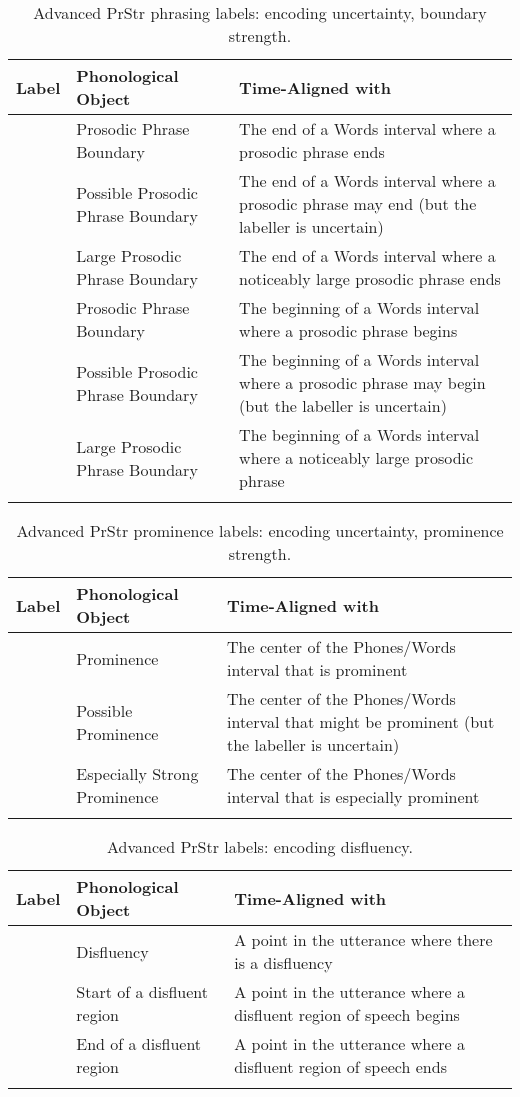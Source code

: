 \documentclass[11pt, twoside]{memoir}
\def\textlabel#1{{\relsize{-.5}\fontspec[Mapping=tex-text]{Roboto Mono}{#1}}}
\begin{document}
\begin{longtable}{cp{.3\linewidth}p{.45\linewidth}}
	\toprule
	\textbf{Label} & \textbf{Phonological Object} & \textbf{Time-Aligned with} \tabularnewline
	\midrule
	\endhead
	\rowcolor{green}
	\textlabel{]} & Prosodic Phrase Boundary & The end of a Words interval where a prosodic phrase ends \tabularnewline
	\textlabel{?]} & Possible Prosodic Phrase Boundary & The end of a Words interval where a prosodic phrase may end (but the labeller is uncertain) \tabularnewline
	\textlabel{]]} & Large Prosodic Phrase Boundary & The end of a Words interval where a noticeably large prosodic phrase ends \tabularnewline
	\textlabel{[} & Prosodic Phrase Boundary & The beginning of a Words interval where a prosodic phrase begins \tabularnewline
	\textlabel{?[} & Possible Prosodic Phrase Boundary & The beginning of a Words interval where a prosodic phrase may begin (but the labeller is uncertain) \tabularnewline
	\textlabel{[[} & Large Prosodic Phrase Boundary & The beginning of a Words interval where a noticeably large prosodic phrase \tabularnewline
	\bottomrule
	\caption{Advanced PrStr phrasing labels: encoding uncertainty, boundary strength.}
\end{longtable}

\begin{longtable}{cp{.3\linewidth}p{.45\linewidth}}
	\toprule
	\textbf{Label} & \textbf{Phonological Object} & \textbf{Time-Aligned with} \tabularnewline
	\midrule
	\endhead
	\rowcolor{green}
	\textlabel{*} & Prominence & The center of the Phones/Words interval that is prominent\tabularnewline
	\textlabel{?*} & Possible Prominence & The center of the Phones/Words interval that might be prominent (but the labeller is uncertain) \tabularnewline
	\textlabel{**} & Especially Strong Prominence & The center of the Phones/Words interval that is especially prominent \tabularnewline
	\bottomrule
	\caption{Advanced PrStr prominence labels: encoding uncertainty, prominence strength.}
\end{longtable}

\begin{longtable}{cp{.3\linewidth}p{.45\linewidth}}
	\toprule
	\textbf{Label} & \textbf{Phonological Object} & \textbf{Time-Aligned with} \tabularnewline
	\midrule
	\endhead
	\textlabel{d} & Disfluency & A point in the utterance where there is a disfluency\tabularnewline
	\textlabel{\{d} & Start of a disfluent region & A point in the utterance where a disfluent region of speech begins\tabularnewline
	\textlabel{d\}} & End of a disfluent region & A point in the utterance where a disfluent region of speech ends\tabularnewline
	\bottomrule
	\caption{Advanced PrStr labels: encoding disfluency.}
\end{longtable}
\end{document}
